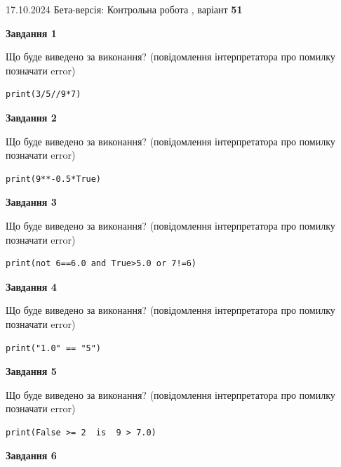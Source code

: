 \documentclass[12pt, ukrainian]{article}
\begin{document}
{\Large{17.10.2024 Бета-версія: Контрольна робота , варіант  \No \textbf { 51 }\par}}
{
\begin {large}
{\begin {center}\textbf{Завдання 1}\end {center}}

Що буде виведено за виконання? (повідомлення інтерпретатора про помилку позначати error)\par
\begin{verbatim}
print(3/5//9*7)
\end{verbatim}

{\begin {center}\textbf{Завдання 2}\end {center}}

Що буде виведено за виконання? (повідомлення інтерпретатора про помилку позначати error)\par
\begin{verbatim}
print(9**-0.5*True)
\end{verbatim}

{\begin {center}\textbf{Завдання 3}\end {center}}

Що буде виведено за виконання? (повідомлення інтерпретатора про помилку позначати error)\par
\begin{verbatim}
print(not 6==6.0 and True>5.0 or 7!=6)
\end{verbatim}

{\begin {center}\textbf{Завдання 4}\end {center}}

Що буде виведено за виконання? (повідомлення інтерпретатора про помилку позначати error)\par
\begin{verbatim}
print("1.0" == "5")
\end{verbatim}

{\begin {center}\textbf{Завдання 5}\end {center}}

Що буде виведено за виконання? (повідомлення інтерпретатора про помилку позначати error)\par
\begin{verbatim}
print(False >= 2  is  9 > 7.0)
\end{verbatim}

{\begin {center}\textbf{Завдання 6}\end {center}}


\end{large}}
\end{document}

